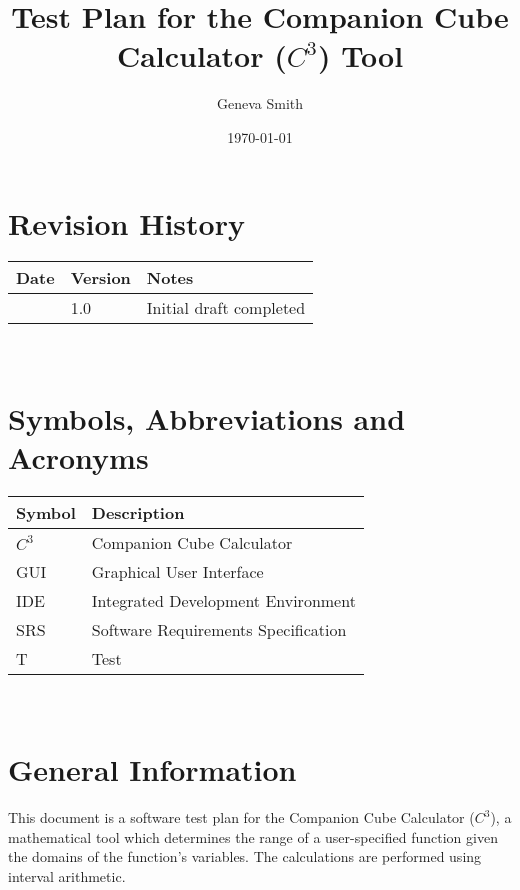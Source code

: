 \documentclass[12pt, titlepage]{article}
\newcommand{\progname}{Companion Cube Calculator} %
\newcommand{\prognameAbbrv}{$C^{3}$}
\begin{document}
\title{Test Plan for the \progname{} (\prognameAbbrv{}) Tool} 
\author{Geneva Smith}
\date{\today}
	
\maketitle


\section{Revision History}

\begin{tabularx}{\textwidth}{p{3cm}p{2cm}X}
\toprule {\bf Date} & {\bf Version} & {\bf Notes}\\
\midrule
 & 1.0 & Initial draft completed\\
\bottomrule
\end{tabularx}

~\newpage

\section{Symbols, Abbreviations and Acronyms}

\renewcommand{\arraystretch}{1.2}
\begin{tabular}{l l} 
  \toprule		
  \textbf{Symbol} & \textbf{Description}\\
  \midrule 
  \prognameAbbrv{} & \progname{}\\
  GUI & Graphical User Interface\\
  IDE & Integrated Development Environment\\
  SRS & Software Requirements Specification\\
  T & Test\\
  \bottomrule
\end{tabular}\\

\newpage

\tableofcontents



\newpage


\section{General Information}
This document is a software test plan for the \progname{} (\prognameAbbrv{}), a 
mathematical tool which determines the range of a user-specified function given 
the domains of the function's variables. The calculations are performed using 
interval arithmetic.
\end{document}
